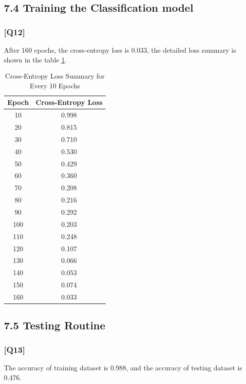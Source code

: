 \documentclass{article}
\begin{document}
\subsection*{7.4 Training the Classification model}

\subsubsection*{[Q12]}

After 160 epochs, the cross-entropy loss is 0.033, the detailed loss summary is shown in the table \ref{tab:cross_entropy_loss}.
\begin{table}[ht]
    \centering
    \caption{Cross-Entropy Loss Summary for Every 10 Epochs}
    \begin{tabular}{cc}
    \toprule
    Epoch & Cross-Entropy Loss \\
    \midrule
    10  & 0.998 \\
    20  & 0.815 \\
    30  & 0.710 \\
    40  & 0.530 \\
    50  & 0.429 \\
    60  & 0.360 \\
    70  & 0.208 \\
    80  & 0.216 \\
    90  & 0.292 \\
    100  & 0.203 \\
    110 & 0.248 \\
    120 & 0.107 \\
    130 & 0.066 \\
    140 & 0.053 \\
    150 & 0.074 \\
    160 & 0.033 \\
    \bottomrule
    \end{tabular}
    \label{tab:cross_entropy_loss}
\end{table}



\subsection*{7.5 Testing Routine}

\subsubsection*{[Q13]}

The accuracy of training dataset is 0.988, and the accuracy of testing dataset is 0.476.
\end{document}

